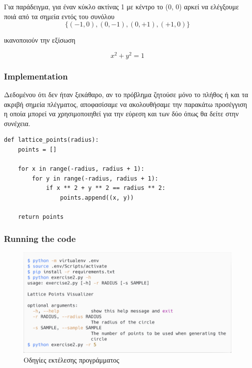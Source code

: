 \documentclass[12pt]{article}
\newenvironment{matlab}
	{\begin{figure}[H]\centering\captionsetup{justification=centering}}
	{\end{figure}}
\begin{document}
Για παράδειγμα, για έναν κύκλο ακτίνας 1 με κέντρο το (0, 0) αρκεί να
ελέγξουμε ποιά από τα σημεία εντός του συνόλου \\

\[ \{ (-1, 0), (0, -1), (0, +1), (+1, 0) \} \]

ικανοποιούν την εξίσωση

\[ x^2 + y^2 = 1 \]

\pagebreak

\subsubsection*{Implementation}

Δεδομένου ότι δεν ήταν ξεκάθαρο, αν το πρόβλημα ζητούσε μόνο
το πλήθος ή και τα ακριβή σημεία πλέγματος,
αποφασίσαμε να ακολουθήσαμε την παρακάτω προσέγγιση η οποία μπορεί να
χρησιμοποιηθεί για την εύρεση και των δύο όπως θα δείτε
στην συνέχεια. \\

\begin{lstlisting}
def lattice_points(radius):
    points = []

    for x in range(-radius, radius + 1):
        for y in range(-radius, radius + 1):
            if x ** 2 + y ** 2 == radius ** 2:
                points.append((x, y))

    return points
\end{lstlisting}

\pagebreak

\subsubsection*{Running the code}

\begin{matlab}
    \includegraphics[scale=0.140]{images/lattice_points.png}
    \caption{Οδηγίες εκτέλεσης προγράμματος}
\end{matlab}
\end{document}
